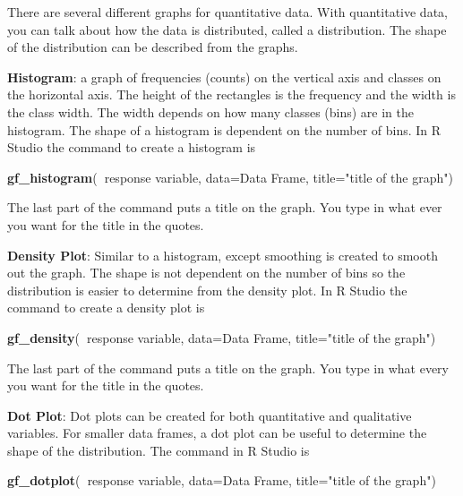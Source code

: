 \documentclass[
]{book}
\newenvironment{Shaded}{\begin{snugshade}}{\end{snugshade}}
\newcommand{\DataTypeTok}[1]{\textcolor[rgb]{0.13,0.29,0.53}{#1}}
\newcommand{\KeywordTok}[1]{\textcolor[rgb]{0.13,0.29,0.53}{\textbf{#1}}}
\newcommand{\NormalTok}[1]{#1}
\newcommand{\OperatorTok}[1]{\textcolor[rgb]{0.81,0.36,0.00}{\textbf{#1}}}
\newcommand{\StringTok}[1]{\textcolor[rgb]{0.31,0.60,0.02}{#1}}
\begin{document}
There are several different graphs for quantitative data. With quantitative data, you can talk about how the data is distributed, called a distribution. The shape of the distribution can be described from the graphs.

\textbf{Histogram}: a graph of frequencies (counts) on the vertical axis and classes on the horizontal axis. The height of the rectangles is the frequency and the width is the class width. The width depends on how many classes (bins) are in the histogram. The shape of a histogram is dependent on the number of bins. In R Studio the command to create a histogram is

\begin{Shaded}
\begin{Highlighting}[]
\KeywordTok{gf_histogram}\NormalTok{(}\OperatorTok{~}\NormalTok{response variable, }\DataTypeTok{data=}\NormalTok{Data Frame, }\DataTypeTok{title=}\StringTok{"title }
\StringTok{of the graph"}\NormalTok{)}
\end{Highlighting}
\end{Shaded}

The last part of the command puts a title on the graph. You type in what ever you want for the title in the quotes.

\textbf{Density Plot}: Similar to a histogram, except smoothing is created to smooth out the graph. The shape is not dependent on the number of bins so the distribution is easier to determine from the density plot. In R Studio the command to create a density plot is

\begin{Shaded}
\begin{Highlighting}[]
\KeywordTok{gf_density}\NormalTok{(}\OperatorTok{~}\NormalTok{response variable, }\DataTypeTok{data=}\NormalTok{Data Frame, }\DataTypeTok{title=}\StringTok{"title of the graph"}\NormalTok{)}
\end{Highlighting}
\end{Shaded}

The last part of the command puts a title on the graph. You type in what every you want for the title in the quotes.

\textbf{Dot Plot}: Dot plots can be created for both quantitative and qualitative variables. For smaller data frames, a dot plot can be useful to determine the shape of the distribution. The command in R Studio is

\begin{Shaded}
\begin{Highlighting}[]
\KeywordTok{gf_dotplot}\NormalTok{(}\OperatorTok{~}\NormalTok{response variable, }\DataTypeTok{data=}\NormalTok{Data Frame, }\DataTypeTok{title=}\StringTok{"title }
\StringTok{of the graph"}\NormalTok{)}
\end{Highlighting}
\end{Shaded}
\end{document}
